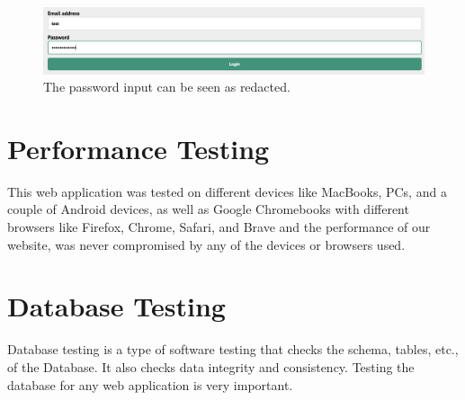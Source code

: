 \begin{figure}
    \centering
    \includegraphics[width=140mm]{Figures/login-page-redacted.png}
    \caption{The password input can be seen as redacted.}
    \label{fig:login-page-redacted}
\end{figure}

\section{Performance Testing}
This web application was tested on different devices like MacBooks, PCs, and a couple of Android devices, as well as Google Chromebooks with different browsers like Firefox, Chrome, Safari, and Brave and the performance of our website, was never compromised by any of the devices or browsers used.

\section{Database Testing}
Database testing is a type of software testing that checks the schema, tables, etc., of the Database. It also checks data integrity and consistency. Testing the database for any web application is very important.

